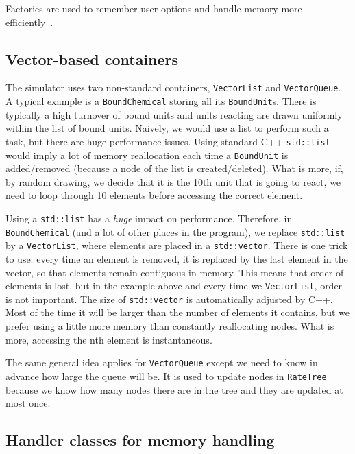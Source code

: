 Factories are used to remember user options and handle memory more efficiently~.

\subsection{Vector-based containers}

The simulator uses two non-standard containers, \texttt{VectorList} and \texttt{VectorQueue}.
A typical example is a \texttt{BoundChemical} storing all its \texttt{BoundUnit}s.
There is typically a high turnover of bound units
and units reacting are drawn uniformly within the list of bound units.
Naively, we would use a list to perform such a task, but there are huge performance issues.
Using standard C++ \texttt{std::list} would imply a lot of memory reallocation each time a \texttt{BoundUnit} is added/removed
(because a node of the list is created/deleted).
What is more, if, by random drawing, we decide that it is the 10th unit that is going to react,
we need to loop through 10 elements before accessing the correct element.

Using a \texttt{std::list} has a \emph{huge} impact on performance.
Therefore, in \texttt{BoundChemical} (and a lot of other places in the program),
we replace \texttt{std::list} by a \texttt{VectorList}, where elements are placed in a \texttt{std::vector}.
There is one trick to use: every time an element is removed,
it is replaced by the last element in the vector, so that elements remain contiguous in memory.
This means that order of elements is lost, but in the example above and every time we \texttt{VectorList},
order is not important. The size of \texttt{std::vector} is automatically adjusted by C++.
Most of the time it will be larger than the number of elements it contains,
but we prefer using a little more memory than constantly reallocating nodes.
What is more, accessing the nth element is instantaneous.

The same general idea applies for \texttt{VectorQueue} except we need to know in advance how large the queue will be.
It is used to update nodes in \texttt{RateTree} because we know how many nodes there are in the tree and they are updated at most once.

\subsection{Handler classes for memory handling}

